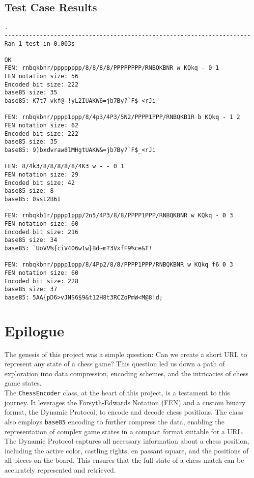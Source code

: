 \documentclass{article}
\begin{document}
\subsection{Test Case Results}
\begin{verbatim}
.
----------------------------------------------------------------------
Ran 1 test in 0.003s

OK
FEN: rnbqkbnr/pppppppp/8/8/8/8/PPPPPPPP/RNBQKBNR w KQkq - 0 1
FEN notation size: 56
Encoded bit size: 222
base85 size: 35
base85: K7t7-vkf@-!yL2IUAKW6=jb7By?`F$_<rJi

FEN: rnbqkbnr/pppp1ppp/8/4p3/4P3/5N2/PPPP1PPP/RNBQKB1R b KQkq - 1 2
FEN notation size: 62
Encoded bit size: 222
base85 size: 35
base85: 9)bxdvraw8lMHgtUAKW&=jb7By?`F$_<rJi

FEN: 8/4k3/8/8/8/8/8/4K3 w - - 0 1
FEN notation size: 29
Encoded bit size: 42
base85 size: 8
base85: 0ssI2B6I

FEN: rnbqkb1r/pppp1ppp/2n5/4P3/8/8/PPPP1PPP/RNBQKBNR w KQkq - 0 3
FEN notation size: 60
Encoded bit size: 216
base85 size: 34
base85: `UoVV%{ciV406w1w}Bd~m?3VxfF9%ce&T!

FEN: rnbqkbnr/pppp1ppp/8/4Pp2/8/8/PPPP1PPP/RNBQKBNR w KQkq f6 0 3
FEN notation size: 60
Encoded bit size: 228
base85 size: 37
base85: 5AA{pD6>vJNS6$9&t12H8t3RCZoPmW<M@8!d;

\end{verbatim}  

\newpage

\section{Epilogue}

The genesis of this project was a simple question: Can we create a short URL to represent any state of a chess game? This question led us down a path of exploration into data compression, encoding schemes, and the intricacies of chess game states. \\

The \verb|ChessEncoder| class, at the heart of this project, is a testament to this journey. It leverages the Forsyth-Edwards Notation (FEN) and a custom binary format, the Dynamic Protocol, to encode and decode chess positions. The class also employs \verb|base85| encoding to further compress the data, enabling the representation of complex game states in a compact format suitable for a URL. \\

The Dynamic Protocol captures all necessary information about a chess position, including the active color, castling rights, en passant square, and the positions of all pieces on the board. This ensures that the full state of a chess match can be accurately represented and retrieved.
\end{document}
